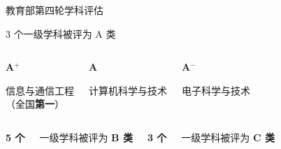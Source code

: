 \documentclass[aspectratio=169, utf8]{beamer}
\begin{document}
\begin{frame}{教育部第四轮学科评估}
    \begin{block}{3 个一级学科被评为 A 类}
        \centering
        \begin{columns}
            \begin{center}
                \Large\textcolor{Fore}{\textbf{A$^+$}}

                \normalsize 信息与通信工程\\（全国\textcolor{Fore}{\textbf{第一}}）
            \end{center}

            \begin{center}
                \Large\textcolor{Fore}{\textbf{A}}

                \normalsize 计算机科学与技术
            \end{center}

            \begin{center}
                \Large\textcolor{Fore}{\textbf{A$^-$}}

                \normalsize 电子科学与技术
            \end{center}
        \end{columns}

        \vspace{1em}
    \end{block}

    \scriptsize\vspace{1em}

    \begin{columns}
        \centering
        \Large\textcolor{Fore}{\textbf{5 个}}

        \normalsize 一级学科被评为 \textcolor{Fore}{\textbf{B 类}}

        \centering
        \Large\textcolor{Fore}{\textbf{3 个}}

        \normalsize 一级学科被评为 \textcolor{Fore}{\textbf{C 类}}

    \end{columns}
\end{frame}
\end{document}
